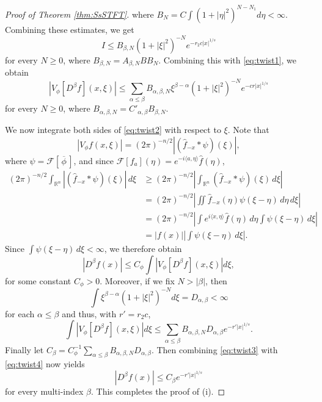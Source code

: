 \documentclass[11pt,a4paper,reqno]{amsart}
\numberwithin{equation}{section}
\theoremstyle{definition}
\theoremstyle{definition}
\begin{document}
\begin{proof}[Proof of Theorem \ref{thm:SsSTFT}]
where $B_N = C \int (1+|\eta|^2)^{N - N_1} d \eta < \infty$.
Combining these estimates, we get
\begin{equation*}
    I \leq B_{\beta,N} (1+|\xi|^2)^{-N} e^{- r_2 c |x|^{1/s}}
\end{equation*}
for every $N\geq 0$, where $B_{\beta,N} = A_{\beta,N} B B_N $.  Combining this with \eqref{eq:twist1}, we obtain
\begin{equation} \label{eq:twist2}
    | V_\phi [D^\beta f](x,\xi) | \leq \sum_{\alpha\leq\beta} B_{\alpha,\beta,N} \xi^{\beta - \alpha} (1+|\xi|^2)^{-N} e^{- c r |x|^{1/s}}
\end{equation}
for every $N\geq 0$, where $B_{\alpha,\beta,N} = C'_{\alpha,\beta} B_{\beta,N}$. 

We now integrate both sides of \eqref{eq:twist2} with respect to $\xi$. Note that
\begin{equation*}
    |V_\phi f(x,\xi)| = (2\pi)^{-n/2}\left|\left(\hat{f}_{-x}*\psi\right) (\xi)\right|,
\end{equation*}
where $\psi = \mathscr{F}\left[\,\overline{\phi}\,\right]$, and since $\mathscr{F}[f_a](\eta) = e^{-i\langle a, \eta \rangle}\hat{f}(\eta)$,
\begin{align*}
    (2\pi)^{-n/2}  \int_{\mathbb{R}^n}\left|\left(\hat{f}_{-x}*\psi\right) (\xi) \right|\, d \xi &\geq (2\pi)^{-n/2} \left| \int_{\mathbb{R}^n}\left(\hat{f}_{-x}*\psi\right) (\xi) \, d \xi \right| \\
    &= (2\pi)^{-n/2} \left|\iint \hat{f}_{-x}(\eta)\psi(\xi - \eta) \, d \eta \, d \xi  \right| \\
    &= (2\pi)^{-n/2} \left| \int e^{i\langle x, \eta \rangle}\hat{f}(\eta) \, d \eta \int \psi(\xi - \eta) \, d \xi \right| \\
    &= |f(x)|\left|\int \psi(\xi - \eta) \, d \xi\right|.
\end{align*}
Since $\int \psi(\xi - \eta) \, d \xi <\infty$, we therefore obtain
\begin{equation}\label{eq:twist3}
    |D^\beta f(x)| \leq C_\phi \int | V_\phi [D^\beta f](x,\xi) | d \xi,
\end{equation}
for some constant $C_\phi > 0$. Moreover, if we fix $N > |\beta|$, then
\begin{equation*}
    \int \xi^{\beta - \alpha} (1+|\xi|^2)^{-N} d \xi = D_{\alpha,\beta} < \infty 
\end{equation*}
for each $\alpha \leq \beta$ and thus, with $r' = r_2 c$,
\begin{equation} \label{eq:twist4}
    \int | V_\phi [D^\beta f](x,\xi) | d \xi \leq \sum_{\alpha\leq\beta} B_{\alpha,\beta,N} D_{\alpha,\beta} e^{- r' |x|^{1/s}}.
\end{equation}
Finally let $C_\beta = C_\phi^{-1}\sum_{\alpha\leq\beta} B_{\alpha,\beta,N} D_{\alpha,\beta}$. Then combining \eqref{eq:twist3} with \eqref{eq:twist4} now yields
\begin{equation*}
    |D^\beta f(x) | \leq C_\beta e^{- r' |x|^{1/s}}
\end{equation*}
for every multi-index $\beta$. This completes the proof of (i). 


\end{proof}
\end{document}
